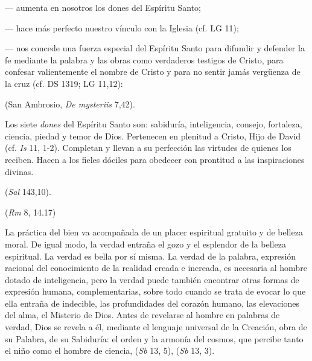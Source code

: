 	--- aumenta en nosotros los dones del Espíritu Santo;
	
	--- hace más perfecto nuestro vínculo con la Iglesia (cf. LG 11);
	
	--- nos concede una fuerza especial del Espíritu Santo para difundir y defender la fe mediante la palabra y las obras como verdaderos testigos de Cristo, para confesar valientemente el nombre de Cristo y para no sentir jamás vergüenza de la cruz (cf. DS 1319; LG 11,12):
	
	 (San Ambrosio, \emph{De mysteriis} 7,42).
	
	 Los siete \emph{dones} del Espíritu Santo son: sabiduría, inteligencia, consejo, fortaleza, ciencia, piedad y temor de Dios. Pertenecen en plenitud a Cristo, Hijo de David (cf. \emph{Is} 11, 1-2). Completan y llevan a su perfección las virtudes de quienes los reciben. Hacen a los fieles dóciles para obedecer con prontitud a las inspiraciones divinas.
	
	 (\emph{Sal} 143,10).
	
	 (\emph{Rm} 8, 14.17)
	
	
	 La práctica del bien va acompañada de un placer espiritual gratuito y de belleza moral. De igual modo, la verdad entraña el gozo y el esplendor de la belleza espiritual. La verdad es bella por sí misma. La verdad de la palabra, expresión racional del conocimiento de la realidad creada e increada, es necesaria al hombre dotado de inteligencia, pero la verdad puede también encontrar otras formas de expresión humana, complementarias, sobre todo cuando se trata de evocar lo que ella entraña de indecible, las profundidades del corazón humano, las elevaciones del alma, el Misterio de Dios. Antes de revelarse al hombre en palabras de verdad, Dios se revela a él, mediante el lenguaje universal de la Creación, obra de su Palabra, de su Sabiduría: el orden y la armonía del cosmos, que percibe tanto el niño como el hombre de ciencia,  (\emph{Sb} 13, 5),  (\emph{Sb} 13, 3).
	
